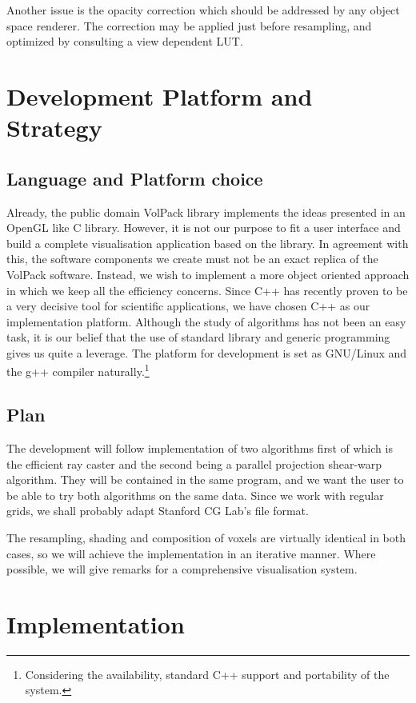 \documentclass[a4paper,12pt]{article}
\begin{document}
Another issue is the opacity correction which should be addressed by
any object space renderer. The correction may be applied just before
resampling, and optimized by consulting a view dependent LUT.

\section{Development Platform and Strategy}

\subsection{Language and Platform choice}

Already, the public domain VolPack library implements the ideas
presented in an OpenGL like C library. However, it is not our purpose
to fit a user interface and build a complete visualisation application
based on the library. In agreement with this, the software components
we create must not be an exact replica of the VolPack software.
Instead, we wish to implement a more object oriented approach in which
we keep all the efficiency concerns. Since C++ has recently proven to
be a very decisive tool for scientific applications, we have chosen
C++ as our implementation platform. Although the study of algorithms
has not been an easy task, it is our belief that the use of standard
library and generic programming gives us quite a leverage. The
platform for development is set as GNU/Linux and the g++ compiler
naturally.\footnote{Considering the availability, standard C++ support
and portability of the system.}

\subsection{Plan}

The development will follow implementation of two algorithms first of
which is the efficient ray caster and the second being a parallel
projection shear-warp algorithm. They will be contained in the same
program, and we want the user to be able to try both algorithms
on the same data. Since we work with regular grids, we shall probably
adapt Stanford CG Lab's file format.

The resampling, shading and composition of voxels are virtually
identical in both cases, so we will achieve the implementation in an
iterative manner. Where possible, we will give remarks for a
comprehensive visualisation system.

\section{Implementation}
\end{document}
